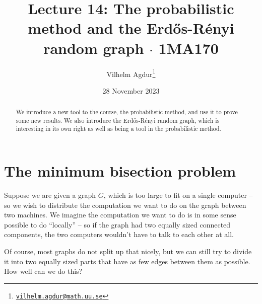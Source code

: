 \documentclass[nobib]{tufte-handout}
\title{Lecture 14: The probabilistic method and the Erd\H{o}s-Rényi random graph $\cdot$ 1MA170}
\author[Vilhelm Agdur]{Vilhelm Agdur\thanks{\href{mailto:vilhelm.agdur@math.uu.se}{\nolinkurl{vilhelm.agdur@math.uu.se}}}}
\date{28 November 2023}
\begin{document}
\maketitle%

\begin{abstract}
\noindent
We introduce a new tool to the course, the probabilistic method, and use it to prove some new results. We also introduce the Erd\H{o}s-Rényi random graph, which is interesting in its own right as well as being a tool in the probabilistic method.
\end{abstract}

\section{The minimum bisection problem}

Suppose we are given a graph $G$, which is too large to fit on a single computer -- so we wish to distribute the computation we want to do on the graph between two machines. We imagine the computation we want to do is in some sense possible to do ``locally'' -- so if the graph had two equally sized connected components, the two computers wouldn't have to talk to each other at all.

Of course, most graphs do not split up that nicely, but we can still try to divide it into two equally sized parts that have as few edges between them as possible. How well can we do this?
\end{document}
